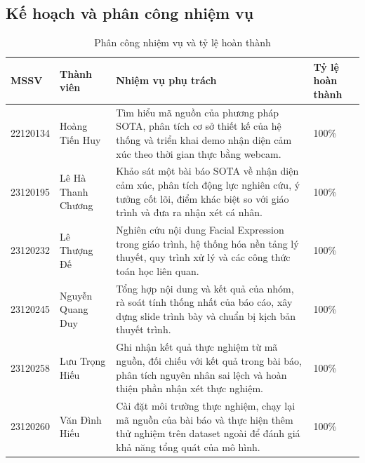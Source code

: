 \subsection{Kế hoạch và phân công nhiệm vụ}

\begin{table}[H]
    \centering
    \caption{Phân công nhiệm vụ và tỷ lệ hoàn thành}
    \begin{tabularx}{\textwidth}{C{2.3cm} L{3.2cm} X C{2.0cm}}
        \toprule
        \textbf{MSSV} & \textbf{Thành viên} & \textbf{Nhiệm vụ phụ trách} & \textbf{Tỷ lệ hoàn thành} \\
        \midrule

        22120134 & Hoàng Tiến Huy 
        & Tìm hiểu mã nguồn của phương pháp SOTA, phân tích cơ sở thiết kế của hệ thống và triển khai demo nhận diện cảm xúc theo thời gian thực bằng webcam.
        & 100\% \\

        23120195 & Lê Hà Thanh Chương
        & Khảo sát một bài báo SOTA về nhận diện cảm xúc, phân tích động lực nghiên cứu, ý tưởng cốt lõi, điểm khác biệt so với giáo trình và đưa ra nhận xét cá nhân.
        & 100\% \\

        23120232 & Lê Thượng Đế
        & Nghiên cứu nội dung Facial Expression trong giáo trình, hệ thống hóa nền tảng lý thuyết, quy trình xử lý và các công thức toán học liên quan.
        & 100\% \\

        23120245 & Nguyễn Quang Duy
        & Tổng hợp nội dung và kết quả của nhóm, rà soát tính thống nhất của báo cáo, xây dựng slide trình bày và chuẩn bị kịch bản thuyết trình.
        & 100\% \\

        23120258 & Lưu Trọng Hiếu
        & Ghi nhận kết quả thực nghiệm từ mã nguồn, đối chiếu với kết quả trong bài báo, phân tích nguyên nhân sai lệch và hoàn thiện phần nhận xét thực nghiệm.
        & 100\% \\

        23120260 & Văn Đình Hiếu
        & Cài đặt môi trường thực nghiệm, chạy lại mã nguồn của bài báo và thực hiện thêm thử nghiệm trên dataset ngoài để đánh giá khả năng tổng quát của mô hình.
        & 100\% \\

        \bottomrule
    \end{tabularx}
\end{table}


